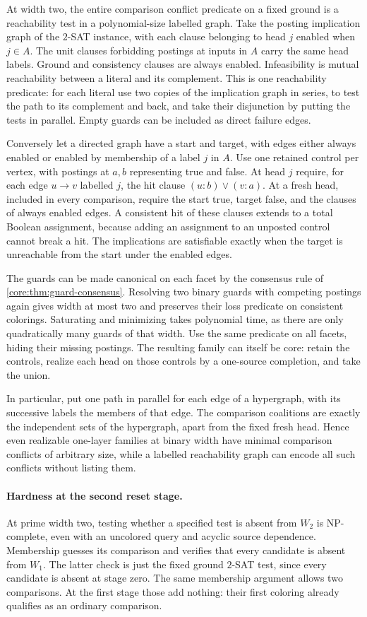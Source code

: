 At width two, the entire comparison conflict
predicate on a fixed ground is a reachability
test in a polynomial-size labelled graph.
Take the posting implication graph of the
$2$-SAT instance, with each clause belonging
to head $j$ enabled when $j\in A$. The unit
clauses forbidding postings at inputs in $A$
carry the same head labels. Ground and
consistency clauses are always enabled.
Infeasibility is mutual reachability between
a literal and its complement. This is one
reachability predicate: for each literal use
two copies of the implication graph in
series, to test the path to its complement
and back, and take their disjunction by
putting the tests in parallel. Empty guards
can be included as direct failure edges.

Conversely let a directed graph have a start
and target, with edges either always enabled
or enabled by membership of a label $j$ in
$A$. Use one retained control per vertex,
with postings at $a,b$ representing true
and false. At head $j$ require, for each
edge $u\to v$ labelled $j$, the hit clause
$(u{:}b)\lor(v{:}a)$. At a fresh head,
included in every comparison, require the
start true, target false, and the clauses
of always enabled edges. A consistent hit
of these clauses extends to a total Boolean
assignment, because adding an assignment
to an unposted control cannot break a hit.
The implications are satisfiable exactly
when the target is unreachable from the
start under the enabled edges.

The guards can be made canonical on each
facet by the consensus rule of
\cref{core:thm:guard-consensus}. Resolving
two binary guards with competing postings
again gives width at most two and preserves
their loss predicate on consistent
colorings. Saturating and minimizing takes
polynomial time, as there are only
quadratically many guards of that width.
Use the same predicate on all facets,
hiding their missing postings. The
resulting family can itself be core:
retain the controls, realize each head on
those controls by a one-source completion,
and take the union.

In particular, put one path in parallel for
each edge of a hypergraph, with its successive
labels the members of that edge. The comparison
coalitions are exactly the independent sets
of the hypergraph, apart from the fixed fresh
head. Hence even realizable one-layer
families at binary width have minimal
comparison conflicts of arbitrary size,
while a labelled reachability graph can
encode all such conflicts without listing them.

\paragraph{Hardness at the second reset stage.}
At prime width two, testing whether a specified
test is absent from $W_2$ is NP-complete, even
with an uncolored query and acyclic source
dependence. Membership guesses its comparison
and verifies that every candidate is absent
from $W_1$. The latter check is just the fixed
ground $2$-SAT test, since every candidate is
absent at stage zero. The same membership
argument allows two comparisons. At the first
stage those add nothing: their first coloring
already qualifies as an ordinary comparison.

